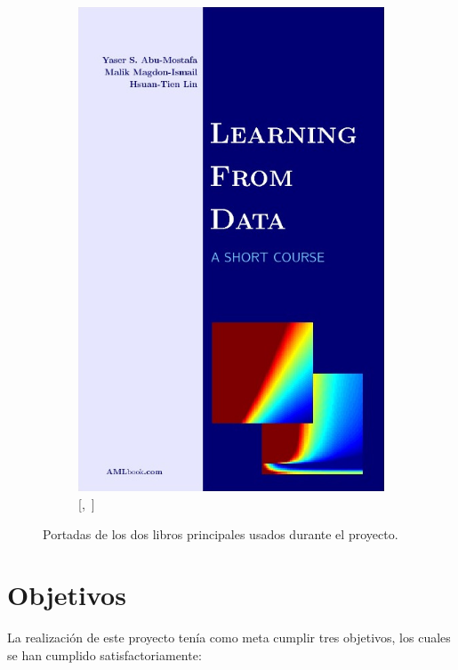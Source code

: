 \begin{figure}[ht]
\begin{subfigure}[b]{0.35\textwidth}
    \includegraphics[width=\textwidth]{figures/ch_01/abu2012learning.jpg}
    \caption{[\citeauthor{abu2012learning},~\citeyear{abu2012learning}]}
    \label{fig:1.2.b}
  \end{subfigure}
  \caption{Portadas de los dos libros principales usados durante el proyecto.}
  \label{fig:1.2}
\end{figure}

\section{Objetivos} \label{sec:1.3}

La realización de este proyecto tenía como meta cumplir tres objetivos, los cuales se han cumplido satisfactoriamente:

